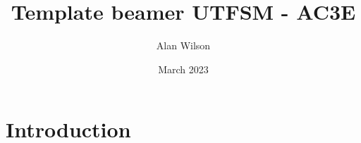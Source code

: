 \documentclass{article}
\title{Template beamer UTFSM - AC3E}
\author{Alan Wilson}
\date{March 2023}
\begin{document}
\maketitle

\section{Introduction}
\end{document}

